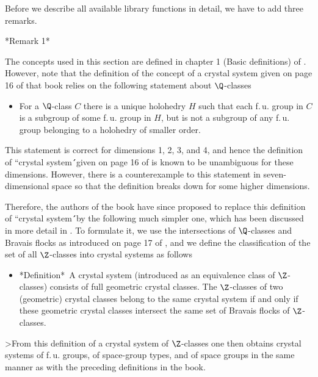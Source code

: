 Before we describe all available library  functions in detail, we have to
add three remarks.

\vspace{5mm}
*Remark 1*

The concepts  used  in  this section are   defined  in chapter 1   (Basic
definitions) of \cite{BBNWZ78}.  However, note that the definition of the
concept of a crystal system given on page  16 of that  book relies on the
following statement about $\Q$-classes\:
\begin{itemize}
\item[] For a  $\Q$-class  $C$  there is a unique holohedry $H$ such that
        each  f.\,u. group in $C$  is a subgroup of some  f.\,u. group in
        $H$,  but is not  a subgroup of any  f.\,u. group  belonging to a
        holohedry of smaller order.
        \vspace{-2mm}
\end{itemize}
This  statement is correct for  dimensions 1, 2,  3, and 4, and hence the
definition of ``crystal system\'\'\ given on page 16 of \cite{BBNWZ78} is
known  to   be unambiguous for   these  dimensions.  However, there  is a
counterexample to  this statement in seven-dimensional  space so that the
definition breaks down for some higher dimensions.

Therefore,  the authors of  the book have  since proposed to replace this
definition of ``crystal system\'\'\  by the  following much simpler  one,
which has been discussed in more detail in \cite{NPW81}. To formulate it,
we use    the   intersections  of $\Q$-classes    and  Bravais  flocks as
introduced on page 17 of \cite{BBNWZ78}, and we define the classification
of the set of all $\Z$-classes into crystal systems as follows\:
\vspace{-2mm}
\begin{itemize}
\item[] *Definition*\:\  A crystal system  (introduced as an  equivalence
        class  of   $\Z$-classes)   consists of  full  geometric  crystal
        classes.  The $\Z$-classes  of  two  (geometric)  crystal classes
        belong to the same crystal system  if and only if these geometric
        crystal  classes  intersect  the same  set of  Bravais  flocks of
        $\Z$-classes.
        \vspace{-2mm}
\end{itemize}
>From  this  definition  of  a  crystal system  of  $\Z$-classes  one then
obtains  crystal systems of f.\,u.  groups,  of space-group types, and of
space groups in the same manner as with the  preceding definitions in the
book.

